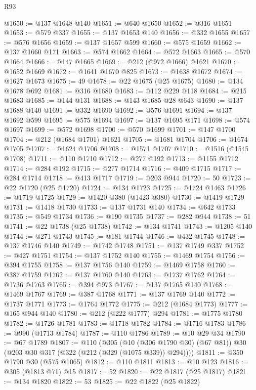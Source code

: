 \begin{lexlean}{R93}
\begin{coremodule}
@1650 := @137 @1648 @140
@1651 := @640 @1650
@1652 := @316 @1651
@1653 := @579 @337
@1655 := @137 @1653 @140
@1656 := @332 @1655
@1657 := @576 @1656
@1659 := @137 @1657 @599
@1660 := @575 @1659
@1662 := @137 @1660 @171
@1663 := @574 @1662
@1664 := @572 @1663
@1665 := @570 @1664
@1666 := @147 @1665
@1669 := @212 (@972 @1666) @1621
@1670 := @1652 @1669
@1672 := @1641 @1670 @825
@1673 := @1638 @1672
@1674 := @1627 @1673
@1675 := 49
@1678 := @22 @1675 (@25 @1675)
@1680 := @134 @1678 @692
@1681 := @316 @1680
@1683 := @112 @229 @118
@1684 := @215 @1683
@1685 := @144 @131
@1688 := @143 @1685 @28 @643
@1690 := @137 @1688 @140
@1691 := @332 @1690
@1692 := @576 @1691
@1694 := @137 @1692 @599
@1695 := @575 @1694
@1697 := @137 @1695 @171
@1698 := @574 @1697
@1699 := @572 @1698
@1700 := @570 @1699
@1701 := @147 @1700
@1704 := @212 (@1684 @1701) @1621
@1705 := @1681 @1704
@1706 := @1674 @1705
@1707 := @1624 @1706
@1708 := @1571 @1707
@1710 := @1516 (@1545 @1708)
@1711 := @110 @1710
@1712 := @277 @192
@1713 := @1155 @1712
@1714 := @284 @192
@1715 := @277 @1714
@1716 := @409 @1715
@1717 := @284 @1714
@1718 := @413 @1717
@1719 := @203 @944
@1720 := 50
@1723 := @22 @1720 (@25 @1720)
@1724 := @134 @1723
@1725 := @1724 @1463
@1726 := @1719 @1725
@1729 := @1420 @380 (@1423 @380)
@1730 := @1419 @1729
@1731 := @1418 @1730
@1733 := @137 @1731 @140
@1734 := @642 @1733
@1735 := @549 @1734
@1736 := @190 @1735
@1737 := @282 @944
@1738 := 51
@1741 := @22 @1738 (@25 @1738)
@1742 := @134 @1741
@1743 := @1205 @140
@1744 := @271 @1743
@1745 := @181 @1744
@1746 := @432 @1745
@1748 := @137 @1746 @140
@1749 := @1742 @1748
@1751 := @137 @1749 @337
@1752 := @427 @1751
@1754 := @137 @1752 @140
@1755 := @1469 @1754
@1756 := @394 @1755
@1758 := @137 @1756 @140
@1759 := @1469 @1758
@1760 := @387 @1759
@1762 := @137 @1760 @140
@1763 := @1737 @1762
@1764 := @1736 @1763
@1765 := @394 @973
@1767 := @137 @1765 @140
@1768 := @1469 @1767
@1769 := @387 @1768
@1771 := @137 @1769 @140
@1772 := @1737 @1771
@1773 := @1764 @1772
@1775 := @212 (@1684 @1773)
@1777 := @165 @944 @140
@1780 := @212 (@222 @1777) @294
@1781 := @1775 @1780
@1782 := @1726 @1781
@1783 := @1718 @1782
@1784 := @1716 @1783
@1786 := @990 (@1713 @1784)
@1787 := @110 @1786
@1789 := @10 @29 @34
@1790 := @67 @1789
@1807 := @110
    (@305
      (@10 (@306 @1790 @30) (@67 @81))
      @30
      (@203 @30 @317 (@322 (@212 (@329 (@1075 @339)) @294))))
@1811 := @350 @1790 @30 (@575 @1065)
@1812 := @110 @1811
@1813 := @10 @123
@1816 := @305 (@1813 @71) @15
@1817 := 52
@1820 := @22 @1817 (@25 @1817)
@1821 := @134 @1820
@1822 := 53
@1825 := @22 @1822 (@25 @1822)

\end{coremodule}
\end{lexlean}
